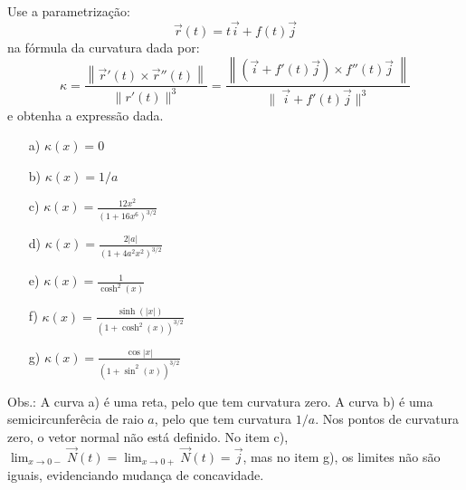 \begin{resol}
  Use a parametrização:
 $$\vec{r}(t) = t\vec{i}+f(t)\vec{j}$$ na fórmula da curvatura dada por:
$$\kappa=\frac{\left\|\vec{r}'(t)\times \vec{r}''(t)\right\|}{\|r'(t)\|^3}=\frac{\left\|\left(\vec{i}+f'(t)\vec{j}\right)\times f''(t)\vec{j}~\!\right\|}{\|~\!\vec{i}+f'(t)\vec{j}\|^3}$$
e obtenha a expressão dada.


\begin{itemize}
\item[a)] $\kappa(x)=0$
\item[b)]$\kappa(x)=1/a$
\item[c)] $\kappa(x)=\frac{12x^2}{\left(1+16x^6\right)^{3/2}}$
\item[d)] $\kappa(x)=\frac{2|a|}{\left(1+4a^2x^2\right)^{3/2}}$ 
\item[e)] $\kappa(x)=\frac{1}{\cosh^2(x)}$
\item[f)] $\kappa(x)=\frac{\sinh(|x|)}{\left(1+\cosh^2(x)\right)^{3/2}}$
\item[g)] $\kappa(x)=\frac{\cos|x|}{\left(1+\sin^2(x)\right)^{3/2}}$
\end{itemize}

Obs.: A curva a) é uma reta, pelo que tem curvatura zero. A curva b) é uma semicircunferêcia de raio $a$, pelo que tem curvatura $1/a$. Nos pontos de curvatura zero, o vetor normal não está definido. 
No item c), $\lim_{x\to 0-}\vec{N}(t)=\lim_{x\to 0+}\vec{N}(t)=\vec{j}$, mas no item g), os limites não são iguais, evidenciando mudança de concavidade.



\end{resol}
